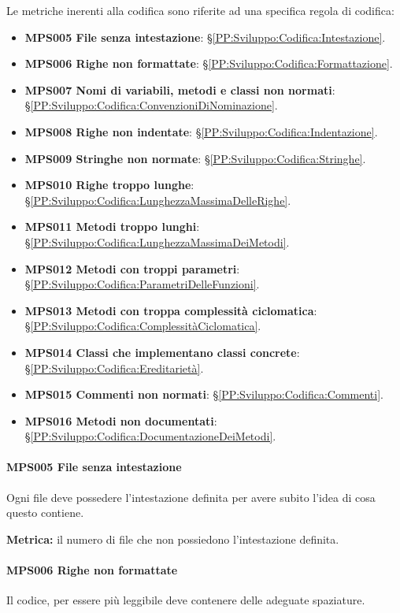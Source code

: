         Le metriche inerenti alla codifica sono riferite ad una specifica regola di codifica:
        \begin{itemize}
            \item \textbf{MPS005 File senza intestazione}: \S\ref{PP:Sviluppo:Codifica:Intestazione}.
            \item \textbf{MPS006 Righe non formattate}: \S\ref{PP:Sviluppo:Codifica:Formattazione}.
            \item \textbf{MPS007 Nomi di variabili, metodi e classi non normati}: \S\ref{PP:Sviluppo:Codifica:ConvenzioniDiNominazione}.
            \item \textbf{MPS008 Righe non indentate}: \S\ref{PP:Sviluppo:Codifica:Indentazione}.
            \item \textbf{MPS009 Stringhe non normate}: \S\ref{PP:Sviluppo:Codifica:Stringhe}.
            \item \textbf{MPS010 Righe troppo lunghe}: \S\ref{PP:Sviluppo:Codifica:LunghezzaMassimaDelleRighe}.
            \item \textbf{MPS011 Metodi troppo lunghi}: \S\ref{PP:Sviluppo:Codifica:LunghezzaMassimaDeiMetodi}.
            \item \textbf{MPS012 Metodi con troppi parametri}: \S\ref{PP:Sviluppo:Codifica:ParametriDelleFunzioni}.
            \item \textbf{MPS013 Metodi con troppa complessità ciclomatica}: \S\ref{PP:Sviluppo:Codifica:ComplessitàCiclomatica}.
            \item \textbf{MPS014 Classi che implementano classi concrete}: \S\ref{PP:Sviluppo:Codifica:Ereditarietà}.
            \item \textbf{MPS015 Commenti non normati}: \S\ref{PP:Sviluppo:Codifica:Commenti}.
            \item \textbf{MPS016 Metodi non documentati}: \S\ref{PP:Sviluppo:Codifica:DocumentazioneDeiMetodi}.
        \end{itemize}
    
        \paragraph{MPS005 File senza intestazione}
        Ogni file deve possedere l'intestazione definita per avere subito l'idea di cosa questo contiene.
        
        \textbf{Metrica:} il numero di file che non possiedono l'intestazione definita.
        
        \paragraph{MPS006 Righe non formattate}
        Il codice, per essere più leggibile deve contenere delle adeguate spaziature.
        

